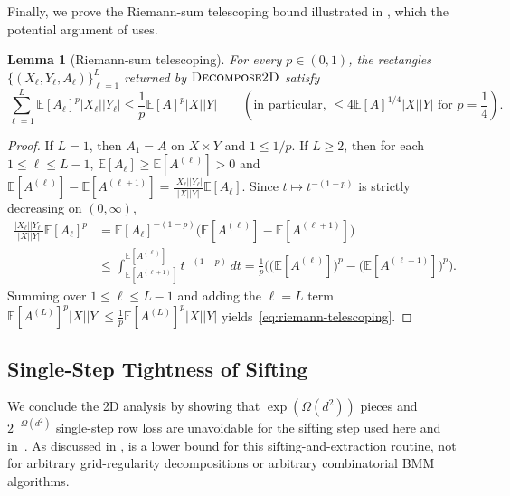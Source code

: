 \documentclass[11pt]{article}
\newtheorem{lemma}[theorem]{Lemma}
\theoremstyle{definition}
\renewcommand{\label}[1]{}%
\newcommand{\E}{\mathbb{E}}
\newcommand{\abs}[1]{\left\lvert #1 \right\rvert}
\newcommand{\dens}[1]{\E[#1]}
\newcommand{\DecomposeTwoD}{\textnormal{\textsc{Decompose2D}}}
\begin{document}
Finally, we prove the Riemann-sum telescoping bound illustrated in , which the potential argument of  uses.

\begin{lemma}[Riemann-sum telescoping]
\label{lem:riemann}
For every $p \in (0, 1)$, the rectangles $\{(X_\ell, Y_\ell, A_\ell)\}_{\ell=1}^L$ returned by $\DecomposeTwoD$ satisfy
\begin{equation}\label{eq:riemann-telescoping}
    \sum_{\ell=1}^L \dens{A_\ell}^p \abs{X_\ell}\abs{Y_\ell} \le \frac{1}{p}\dens{A}^p \abs{X}\abs{Y} \qquad \left(\text{in particular, } \le 4\dens{A}^{1/4}\abs{X}\abs{Y} \text{ for } p = \frac{1}{4}\right).
\end{equation}
\end{lemma}

\begin{proof}
If $L = 1$, then $A_1 = A$ on $X \times Y$ and $1 \le 1/p$. If $L \ge 2$, then for each $1 \le \ell \le L-1$, $\dens{A_\ell} \ge \dens{A^{(\ell)}} > 0$ and $\dens{A^{(\ell)}} - \dens{A^{(\ell+1)}} = \frac{\abs{X_\ell}\abs{Y_\ell}}{\abs{X}\abs{Y}}\dens{A_\ell}$. Since $t \mapsto t^{-(1-p)}$ is strictly decreasing on $(0, \infty)$,
\begin{align*}
    \frac{\abs{X_\ell}\abs{Y_\ell}}{\abs{X}\abs{Y}}\dens{A_\ell}^p &= \dens{A_\ell}^{-(1-p)}\big(\dens{A^{(\ell)}} - \dens{A^{(\ell+1)}}\big) \\
    &\le \int_{\dens{A^{(\ell+1)}}}^{\dens{A^{(\ell)}}} t^{-(1-p)}\,dt = \frac{1}{p}\Big(\big(\dens{A^{(\ell)}}\big)^p - \big(\dens{A^{(\ell+1)}}\big)^p\Big).
\end{align*}
Summing over $1 \le \ell \le L-1$ and adding the $\ell = L$ term $\dens{A^{(L)}}^p\abs{X}\abs{Y} \le \frac{1}{p}\dens{A^{(L)}}^p\abs{X}\abs{Y}$ yields~\eqref{eq:riemann-telescoping}.
\end{proof}

\subsection{Single-Step Tightness of Sifting}
\label{sec:2d-tightness}

We conclude the 2D analysis by showing that $\exp(\Omega(d^2))$ pieces and $2^{-\Omega(d^2)}$ single-step row loss are unavoidable for the sifting step used here and in~\cite{AFKLM24}. As discussed in ,  is a lower bound for this sifting-and-extraction routine, not for arbitrary grid-regularity decompositions or arbitrary combinatorial BMM algorithms.
\end{document}
